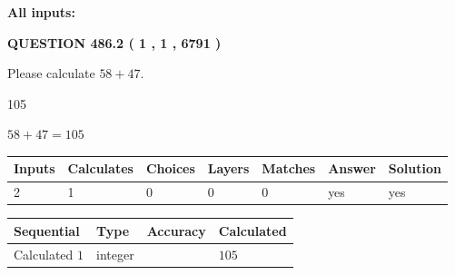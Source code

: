 \documentclass[12pt]{article}
\begin{document}
   
   
   
\noindent{}
   
   
   
   
\noindent\vspace{0.1in}\hspace{-0.08in} {\textbf{\Large{All inputs: }}}
   
   
  
\vspace{0.2in}
  
{\textbf{\Large{QUESTION
486.2 
 ( 1 , 1 , 6791 )
}}}
  
  
 
Please calculate $ %
58 +  %
47 $.
 
 
 
\noindent{}
 
 

105
 
 
\noindent{}
 
 

 
 
 
\noindent{}
 
 

$ %
58 +  %
47=   %
105$
 
 
\noindent{}
 
 

 
   
   
   
   
\noindent\begin{tabular}{|l|l|l|l|l|l|l|}
 \hline
Inputs & Calculates & Choices & Layers & Matches & Answer & Solution \\ \hline
 2  & 
 1  & 
 0
  & 
 0  & 
 0  & 
  yes & 
  yes 
  \\ \hline
 \end{tabular}
   
   
   
   
\noindent{}
   
   
  
  
\noindent\begin{tabular}{|l|l|l|l|}
\hline
 Sequential & Type & Accuracy & Calculated \\ 
\hline
 
 
  Calculated $  1 $ & integer &  & 
  $ 105 $ 
 \\  \hline  
 \end{tabular}
   
\end{document}
